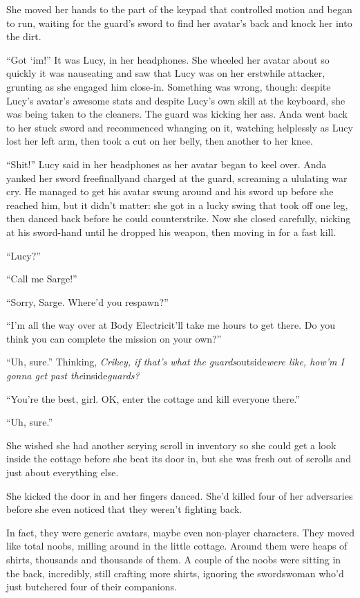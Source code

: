 She moved her hands to the part of the keypad that controlled
motion and began to run, waiting for the guard’s sword to find her
avatar’s back and knock her into the dirt.

“Got ‘im!” It was Lucy, in her headphones. She wheeled her avatar
about so quickly it was nauseating and saw that Lucy was on her
erstwhile attacker, grunting as she engaged him close-in. Something
was wrong, though: despite Lucy’s avatar’s awesome stats and
despite Lucy’s own skill at the keyboard, she was being taken to
the cleaners. The guard was kicking her ass. Anda went back to her
stuck sword and recommenced whanging on it, watching helplessly as
Lucy lost her left arm, then took a cut on her belly, then another
to her knee.

“Shit!” Lucy said in her headphones as her avatar began to keel
over. Anda yanked her sword free\dash{}finally\dash{}and charged at the guard,
screaming a ululating war cry. He managed to get his avatar swung
around and his sword up before she reached him, but it didn’t
matter: she got in a lucky swing that took off one leg, then danced
back before he could counterstrike. Now she closed carefully,
nicking at his sword-hand until he dropped his weapon, then moving
in for a fast kill.

“Lucy?”

“Call me Sarge!”

“Sorry, Sarge. Where’d you respawn?”

“I’m all the way over at Body Electric\dash{}it’ll take me hours to get
there. Do you think you can complete the mission on your own?”

“Uh, sure.” Thinking,
\emph{Crikey, if that’s what the guards}outside\emph{were like, how’m I gonna get past the}inside\emph{guards?}

“You’re the best, girl. OK, enter the cottage and kill everyone
there.”

“Uh, sure.”

She wished she had another scrying scroll in inventory so she could
get a look inside the cottage before she beat its door in, but she
was fresh out of scrolls and just about everything else.

She kicked the door in and her fingers danced. She’d killed four of
her adversaries before she even noticed that they weren’t fighting
back.

In fact, they were generic avatars, maybe even non-player
characters. They moved like total noobs, milling around in the
little cottage. Around them were heaps of shirts, thousands and
thousands of them. A couple of the noobs were sitting in the back,
incredibly, still crafting more shirts, ignoring the swordswoman
who’d just butchered four of their companions.

